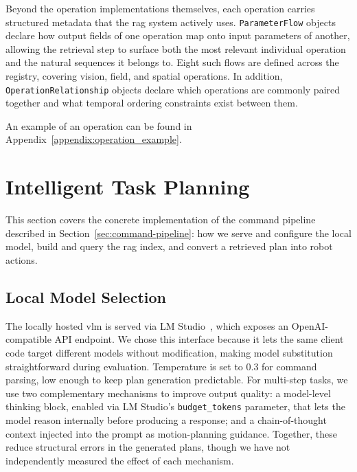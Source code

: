 \documentclass[
     12pt,
     a4paper,
     BCOR=10mm,
     DIV=14,
     listof=totoc,
     bibliography=totoc,
     parskip,
     twoside,
     headsepline
     ]{scrreprt}
\begin{document}
Beyond the operation implementations themselves, each operation carries structured metadata that the \gls{rag} system actively uses. \texttt{ParameterFlow} objects declare how output fields of one operation map onto input parameters of another, allowing the retrieval step to surface both the most relevant individual operation and the natural sequences it belongs to. Eight such flows are defined across the registry, covering vision, field, and spatial operations. In addition, \texttt{OperationRelationship} objects declare which operations are commonly paired together and what temporal ordering constraints exist between them.

An example of an operation can be found in Appendix~\ref{appendix:operation_example}.

\section{Intelligent Task Planning}\label{sec:planning-impl}
This section covers the concrete implementation of the command pipeline described in Section~\ref{sec:command-pipeline}: how we serve and configure the local model, build and query the \gls{rag} index, and convert a retrieved plan into robot actions.

\subsection{Local Model Selection}
The locally hosted \gls{vlm} is served via LM Studio~\cite{lmstudio}, which exposes an OpenAI-compatible API endpoint. We chose this interface because it lets the same client code target different models without modification, making model substitution straightforward during evaluation. Temperature is set to 0.3 for command parsing, low enough to keep plan generation predictable. For multi-step tasks, we use two complementary mechanisms to improve output quality: a model-level thinking block, enabled via LM Studio's \texttt{budget\_tokens} parameter, that lets the model reason internally before producing a response; and a chain-of-thought context injected into the prompt as motion-planning guidance. Together, these reduce structural errors in the generated plans, though we have not independently measured the effect of each mechanism.
\end{document}
